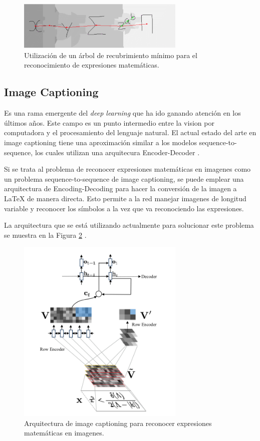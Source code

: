 \begin{figure}[h]
	\centering
	\includegraphics[width=8cm]{capitulo2/images/spanningtree}
	\caption{Utilización de un árbol de recubrimiento mínimo para el reconocimiento de expresiones matemáticas.}
	\label{fig:spanningtree}
\end{figure}


\subsection{Image Captioning}

Es una rama emergente del \textit{deep learning} que ha ido ganando atención en los últimos años. Este campo es un punto intermedio entre la vision por computadora y el procesamiento del lenguaje natural. El actual estado del arte en image captioning tiene una aproximación similar a los modelos sequence-to-sequence, los cuales utilizan una arquitecura Encoder-Decoder \cite{imagetolatex}.

Si se trata al problema de reconocer expresiones matemáticas en imagenes como un problema sequence-to-sequence de image captioning, se puede emplear una arquitectura de Encoding-Decoding para hacer la conversión de la imagen a LaTeX de manera directa. Esto permite a la red manejar imagenes de longitud variable y reconocer los símbolos a la vez que va reconociendo las expresiones.

La arquitectura que se está utilizando actualmente para solucionar este problema se muestra en la Figura \ref{fig:imgcaptioning} \cite{imagetolatex}\cite{imagemarkup}\cite{chino}.

\begin{figure}
	\centering
	\includegraphics[width=8cm]{capitulo2/images/imgcaptioning}
	\caption{Arquitectura de image captioning para reconocer expresiones matemáticas en imagenes.}
	\label{fig:imgcaptioning}
\end{figure}

